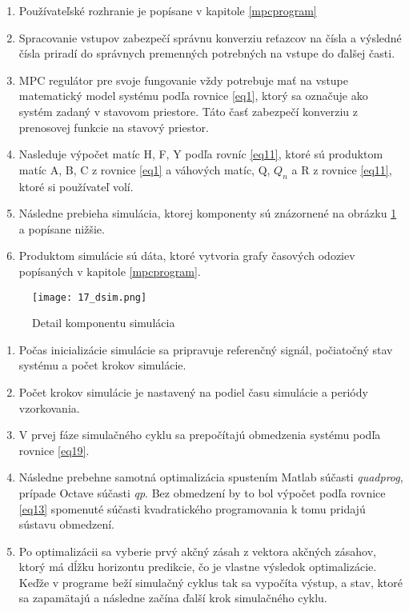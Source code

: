 \begin{enumerate}
  \item
    Používateľské rozhranie je popísane v kapitole \ref{mpcprogram}
  \item
    Spracovanie vstupov zabezpečí správnu konverziu reťazcov na čísla a výsledné čísla priradí do správnych premenných potrebných na vstupe do ďalšej časti.
  \item
    MPC regulátor pre svoje fungovanie vždy potrebuje mať na vstupe   matematický model systému podľa rovnice \ref{eq1}, ktorý sa označuje ako systém zadaný v stavovom priestore. Táto časť zabezpečí konverziu z prenosovej funkcie na stavový priestor.
  \item
   Nasleduje výpočet matíc H, F, Y podľa rovníc \ref{eq11}, ktoré sú produktom matíc A, B, C z rovnice \ref{eq1} a váhových matíc, Q, $Q_n$ a R z rovnice \ref{eq11}, ktoré si používateľ volí.
   \item
   Následne prebieha simulácia, ktorej komponenty sú znázornené na obrázku \ref{17_dsim} a popísane nižšie.
   \item
   Produktom simulácie sú dáta, ktoré vytvoria grafy časových odoziev popísaných v kapitole \ref{mpcprogram}.
\end{enumerate}

\begin{figure}[!htbp]
\centering
\texttt{[image: 17\_dsim.png]}
\caption{Detail komponentu simulácia}
\label{17_dsim}
\end{figure}
\begin{enumerate}
  \item
	Počas inicializácie simulácie sa pripravuje referenčný signál, počiatočný stav systému a počet krokov simulácie.
  \item
    Počet krokov simulácie je nastavený na podiel času simulácie a periódy vzorkovania.
  \item
    V prvej fáze simulačného cyklu sa prepočítajú obmedzenia systému podľa rovnice \ref{eq19}.
  \item 
    Následne prebehne samotná optimalizácia spustením Matlab súčasti \textit{quadprog}, prípade Octave súčasti \textit{qp}. Bez obmedzení by to bol výpočet podľa rovnice \ref{eq13} spomenuté súčasti kvadratického programovania k tomu pridajú sústavu obmedzení.
  \item
    Po optimalizácii sa vyberie prvý akčný zásah z vektora akčných zásahov, ktorý má dĺžku horizontu predikcie, čo je vlastne výsledok optimalizácie. Keďže v programe beží simulačný cyklus tak sa vypočíta výstup, a stav, ktoré sa zapamätajú a následne začína ďalší krok simulačného cyklu.
\end{enumerate}


